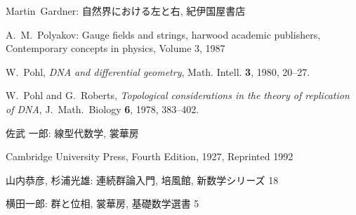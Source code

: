 \documentclass[12pt,twoside]{jarticle}
\begin{document}
\begin{thebibliography}{ABC}

Martin~Gardner: 自然界における左と右, 紀伊国屋書店




A.~M.~Polyakov: Gauge fields and strings, harwood academic publishers,
Contemporary concepts in physics, Volume 3, 1987

W.~Pohl,
{\em DNA and differential geometry},
Math. Intell. {\bf 3}, 1980, 20--27.

W.~Pohl and G.~Roberts,
{\em Topological considerations in the theory of replication of DNA},
J.~Math.~Biology {\bf 6}, 1978, 383--402.

佐武 一郎: 線型代数学, 裳華房





Cambridge University Press, Fourth Edition, 1927, Reprinted 1992

山内恭彦, 杉浦光雄: 連続群論入門, 培風館, 新数学シリーズ 18

横田一郎: 群と位相, 裳華房, 基礎数学選書 5

\end{thebibliography}

\end{document}
